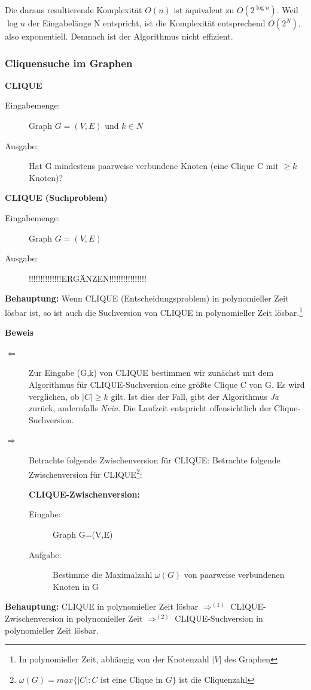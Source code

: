 \documentclass{article} %
\begin{document}
Die daraus resultierende Komplexität $O(n)$ ist äquivalent zu $O(2^{\log n})$.
Weil $\log n$ der Eingabelänge N entspricht, ist die Komplexität entsprechend $O(2^N)$, also exponentiell.
Demnach ist der Algorithmus nicht effizient.

\subsubsection{Cliquensuche im Graphen}

\begin{framed}
\textbf{CLIQUE}\\
\begin{description}
	\item[Eingabemenge:] Graph $G= (V,E)$ und $k \in N$
	\item[Ausgabe:] Hat G mindestens paarweise verbundene Knoten (eine Clique C mit $\geq k$ Knoten)?
\end{description} 
\end{framed}

\begin{framed}
\textbf{CLIQUE (Suchproblem)}\\
\begin{description}
	\item[Eingabemenge:] Graph $G= (V,E)$
	\item[Ausgabe:] !!!!!!!!!!!!!!ERGÄNZEN!!!!!!!!!!!!!!!!
\end{description} 
\end{framed}

\textbf{Behauptung:} Wenn CLIQUE (Entscheidungsproblem) in polynomieller Zeit lösbar ist, so ist auch die Suchversion von CLIQUE in polynomieller Zeit lösbar.\footnote{In polynomieller Zeit, abhängig von der Knotenzahl $|V|$ des Graphen}

\textbf{Beweis}
\begin{description}
\item[$\Leftarrow$] Zur Eingabe (G,k) von CLIQUE  bestimmen wir zunächst mit dem Algorithmus für CLIQUE-Suchversion eine größte Clique C von G.
Es wird verglichen, ob $|C| \geq k$ gilt.
Ist dies der Fall, gibt der Algorithmus \emph{Ja} zurück, andernfalls \emph{Nein}.
Die Laufzeit entspricht offensichtlich der Clique-Suchversion.

\item[$\Rightarrow$] Betrachte folgende Zwischenversion für CLIQUE:
Betrachte folgende Zwischenversion für CLIQUE\footnote{$\omega(G) = max \{|C|: C$ ist eine Clique in $G\}$ ist die Cliquenzahl}:
\begin{framed}
\textbf{CLIQUE-Zwischenversion:}
\begin{description}
\item  [Eingabe:]Graph G=(V,E)
\item [Aufgabe:] Bestimme die Maximalzahl $\omega (G)$  von paarweise verbundenen Knoten in G
\end{description}
\end{framed}
\end{description}
\textbf{Behauptung:} CLIQUE in polynomieller Zeit lösbar $\Rightarrow^{(1)}$ CLIQUE-Zwischenversion in polynomieller Zeit $\Rightarrow^{(2)}$ CLIQUE-Suchversion in polynomieller Zeit lösbar.
\end{document}
